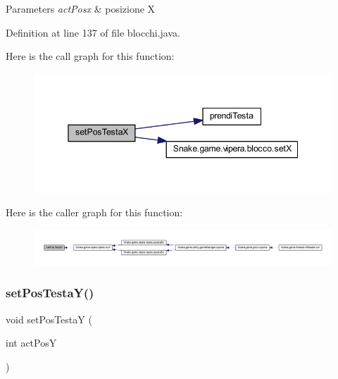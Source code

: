 \begin{DoxyParams}{Parameters}
{\em act\+Posx} & posizione X \\
\hline
\end{DoxyParams}


Definition at line 137 of file blocchi.\+java.

Here is the call graph for this function\+:
\nopagebreak
\begin{figure}[H]
\begin{center}
\leavevmode
\includegraphics[width=345pt]{class_snake_1_1game_1_1vipera_1_1blocchi_a1e26556cba7802de510ce21bc9096149_cgraph}
\end{center}
\end{figure}
Here is the caller graph for this function\+:
\nopagebreak
\begin{figure}[H]
\begin{center}
\leavevmode
\includegraphics[width=350pt]{class_snake_1_1game_1_1vipera_1_1blocchi_a1e26556cba7802de510ce21bc9096149_icgraph}
\end{center}
\end{figure}
\mbox{\label{class_snake_1_1game_1_1vipera_1_1blocchi_a7136da8bd75e6d0622eecf38aea1b60e}} 
\subsubsection{\texorpdfstring{set\+Pos\+Testa\+Y()}{setPosTestaY()}}
{\footnotesize\ttfamily void set\+Pos\+TestaY (\begin{DoxyParamCaption}\item[{int}]{act\+PosY }\end{DoxyParamCaption})}



